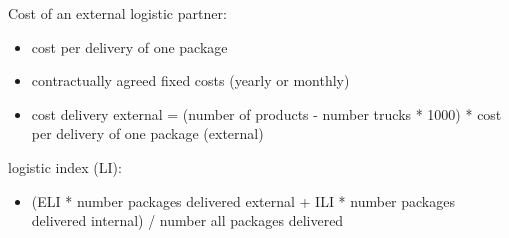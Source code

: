 Cost of an external logistic partner:
    \begin{itemize}
        \item cost per delivery of one package 
        \item contractually agreed fixed costs (yearly or monthly)
        \item cost delivery external = (number of products - number trucks * 1000) * cost per delivery of one package (external)
    \end{itemize}


logistic index (LI):
\begin{itemize}
\item (ELI * number packages delivered external + ILI * number packages delivered internal) / number all packages delivered 
\end{itemize}